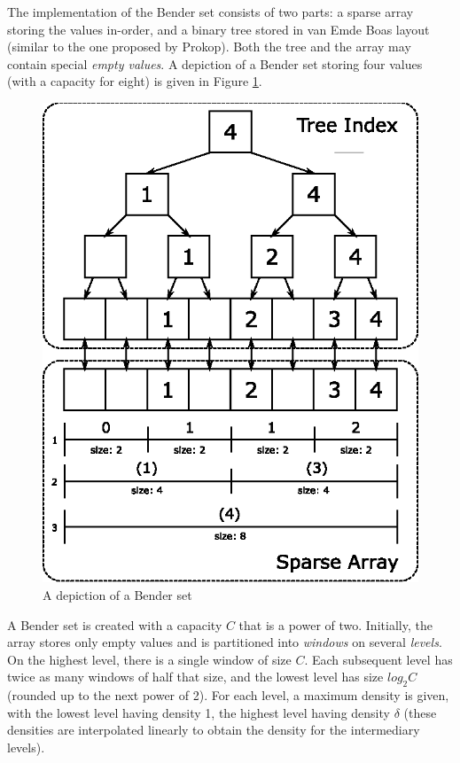 \documentclass{acm_proc_article-sp}
\begin{document}
The implementation of the Bender set consists of two parts: a sparse array
storing the values in-order, and a binary tree stored in van Emde Boas
layout (similar to the one proposed by Prokop). Both the tree and the array
may contain special \emph{empty values}. A depiction of a Bender set storing
four values (with a capacity for eight) is given in Figure \ref{fig-bender-set}.

\begin{figure}
\centering
\includegraphics{bender-set}
\caption{A depiction of a Bender set}\label{fig-bender-set}
\end{figure}

A Bender set is created with a capacity $C$ that is a power of two.
Initially, the array stores only empty values and is partitioned into
\emph{windows} on several \emph{levels}.
On the highest level, there is a single window of size $C$. Each subsequent level
has twice as many windows of half that size, and the lowest level has size $log_2 C$
(rounded up to the next power of 2).
For each level, a maximum density is given, with the lowest level having density 1,
the highest level having density $\delta$ (these densities are interpolated linearly
to obtain the density for the intermediary levels).
\end{document}
